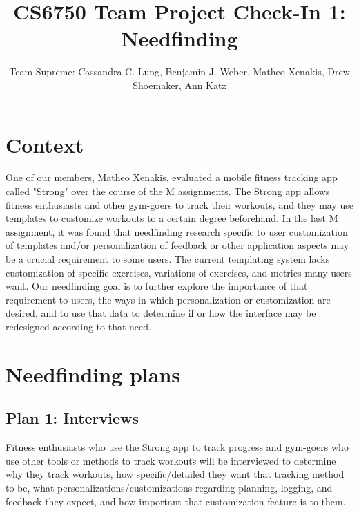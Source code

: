 \documentclass[
	letterpaper, %
]{jdf}
\author{Team Supreme: Cassandra C. Lung, Benjamin J. Weber, Matheo Xenakis, Drew Shoemaker, Ann Katz}
\title{CS6750 Team Project Check-In 1: Needfinding}
\begin{document}

\maketitle
\section{Context}
One of our members, Matheo Xenakis, evaluated a mobile fitness tracking app called "Strong" over the course of the M assignments. The Strong app allows fitness enthusiasts and other gym-goers to track their workouts, and they may use templates to customize workouts to a certain degree beforehand. In the last M assignment, it was found that needfinding research specific to user customization of templates and/or personalization of feedback or other application aspects may be a crucial requirement to some users. The current templating system lacks customization of specific exercises, variations of exercises, and metrics many users want. Our needfinding goal is to further explore the importance of that requirement to users, the ways in which personalization or customization are desired, and to use that data to determine if or how the interface may be redesigned according to that need.

\section{Needfinding plans}
\subsection{Plan 1: Interviews}
Fitness enthusiasts who use the Strong app to track progress and gym-goers who use other tools or methods to track workouts will be interviewed to determine why they track workouts, how specific/detailed they want that tracking method to be, what personalizations/customizations regarding planning, logging, and feedback they expect, and how important that customization feature is to them.
\end{document}
